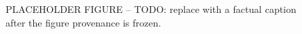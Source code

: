 \begin{figure}[t]
  \centering
  \caption{PLACEHOLDER FIGURE -- TODO: replace with a factual caption after the figure provenance is frozen.}
  \label{fig:placeholder-overview}
\end{figure}
